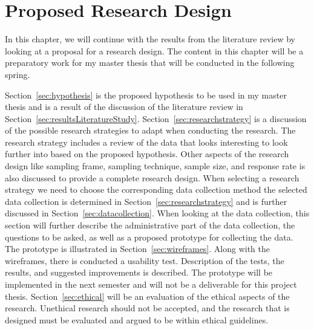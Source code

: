 \chapter{Proposed Research Design}
  \label{chapter:researchDesign}

  In this chapter, we will continue with the results from the literature review by looking at a proposal for a research design. The content in this chapter will be a preparatory work for my master thesis that will be conducted in the following spring.

  Section~\ref{sec:hypothesis} is the proposed hypothesis to be used in my master thesis and is a result of the discussion of the literature review in Section~\ref{sec:resultsLiteratureStudy}. Section~\ref{sec:researchstrategy} is a discussion of the possible research strategies to adapt when conducting the research. The research strategy includes a review of the data that looks interesting to look further into based on the proposed hypothesis. Other aspects of the research design like sampling frame, sampling technique, sample size, and response rate is also discussed to provide a complete research design. When selecting a research strategy we need to choose the corresponding data collection method the selected data collection is determined in Section~\ref{sec:researchstrategy} and is further discussed in Section~\ref{sec:datacollection}. When looking at the data collection, this section will further describe the administrative part of the data collection, the questions to be asked, as well as a proposed prototype for collecting the data. The prototype is illustrated in Section~\ref{sec:wireframes}. Along with the wireframes, there is conducted a usability test. Description of the tests, the results, and suggested improvements is described. The prototype will be implemented in the next semester and will not be a deliverable for this project thesis. Section~\ref{sec:ethical} will be an evaluation of the ethical aspects of the research. Unethical research should not be accepted, and the research that is designed must be evaluated and argued to be within ethical guidelines.


  
   

 

  

      
